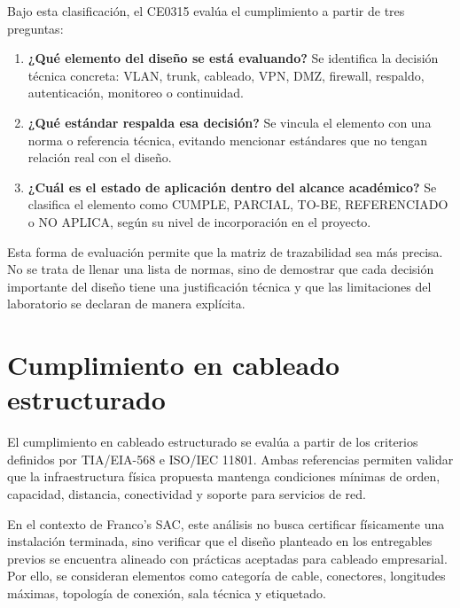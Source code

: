 \documentclass[11pt, a4paper, oneside]{report}
\begin{document}
\normalsize

Bajo esta clasificación, el CE0315 evalúa el cumplimiento a partir de tres preguntas:

\begin{enumerate}
    \item \textbf{¿Qué elemento del diseño se está evaluando?}  
    Se identifica la decisión técnica concreta: VLAN, trunk, cableado, VPN, DMZ, firewall, respaldo, autenticación, monitoreo o continuidad.

    \item \textbf{¿Qué estándar respalda esa decisión?}  
    Se vincula el elemento con una norma o referencia técnica, evitando mencionar estándares que no tengan relación real con el diseño.

    \item \textbf{¿Cuál es el estado de aplicación dentro del alcance académico?}  
    Se clasifica el elemento como CUMPLE, PARCIAL, TO-BE, REFERENCIADO o NO APLICA, según su nivel de incorporación en el proyecto.
\end{enumerate}

Esta forma de evaluación permite que la matriz de trazabilidad sea más precisa. No se trata de llenar una lista de normas, sino de demostrar que cada decisión importante del diseño tiene una justificación técnica y que las limitaciones del laboratorio se declaran de manera explícita.

\section{Cumplimiento en cableado estructurado}

El cumplimiento en cableado estructurado se evalúa a partir de los criterios definidos por TIA/EIA-568 e ISO/IEC 11801. Ambas referencias permiten validar que la infraestructura física propuesta mantenga condiciones mínimas de orden, capacidad, distancia, conectividad y soporte para servicios de red.

En el contexto de Franco's SAC, este análisis no busca certificar físicamente una instalación terminada, sino verificar que el diseño planteado en los entregables previos se encuentra alineado con prácticas aceptadas para cableado empresarial. Por ello, se consideran elementos como categoría de cable, conectores, longitudes máximas, topología de conexión, sala técnica y etiquetado.

\renewcommand{\arraystretch}{1.3}
\footnotesize
{}
\end{document}
